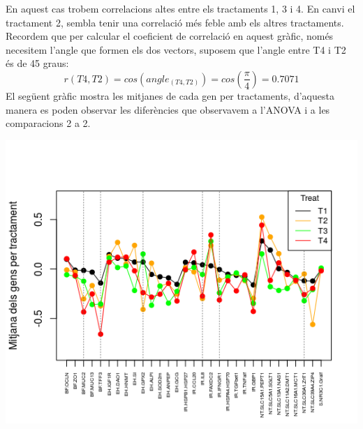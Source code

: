 \documentclass[english]{article}
\begin{document}
En aquest cas trobem correlacions altes entre els tractaments 1, 3 i 4. En canvi el tractament 2, sembla tenir una correlació més feble amb els altres tractaments. Recordem que per calcular el coeficient de correlació en aquest gràfic, només necesitem l'angle que formen els dos vectors, suposem que l'angle entre T4 i T2 és de 45 graus:
\begin{equation*}
r(T4,T2)= cos(angle_{(T4,T2)})= cos(\frac{\pi}{4})= 0.7071
\end{equation*}
El següent gràfic mostra les mitjanes de cada gen per tractaments, d'aquesta manera es poden observar les diferències que observavem a l'ANOVA i a les comparacions 2 a 2.
\begin{center}
\includegraphics[scale=0.6]{lineploti.png}
\end{center}
\end{document}
